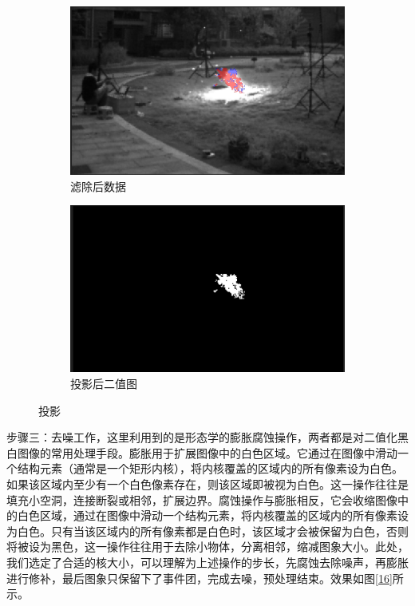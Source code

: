 \begin{figure}[ht]
    \centering
    \begin{subfigure}{0.49\textwidth}
        \centering
        \includegraphics[width=\textwidth]{figures/extract_process_02.png}
        \caption{滤除后数据}
        \label{15.a}
    \end{subfigure}
    \hfill
    \begin{subfigure}{0.49\textwidth}
        \centering
        \includegraphics[width=\textwidth]{figures/extract_process_03.png}
        \caption{投影后二值图}
        \label{15.b}
    \end{subfigure}
    \caption{投影}
    \label{15}
\end{figure}

步骤三：去噪工作，这里利用到的是形态学的膨胀腐蚀操作，两者都是对二值化黑白图像的常用处理手段。膨胀用于扩展图像中的白色区域。它通过在图像中滑动一个结构元素（通常是一个矩形内核），将内核覆盖的区域内的所有像素设为白色。如果该区域内至少有一个白色像素存在，则该区域即被视为白色。这一操作往往是填充小空洞，连接断裂或相邻，扩展边界。腐蚀操作与膨胀相反，它会收缩图像中的白色区域，通过在图像中滑动一个结构元素，将内核覆盖的区域内的所有像素设为白色。只有当该区域内的所有像素都是白色时，该区域才会被保留为白色，否则将被设为黑色，这一操作往往用于去除小物体，分离相邻，缩减图象大小。此处，我们选定了合适的核大小，可以理解为上述操作的步长，先腐蚀去除噪声，再膨胀进行修补，最后图象只保留下了事件团，完成去噪，预处理结束。效果如图\ref{16}所示。

